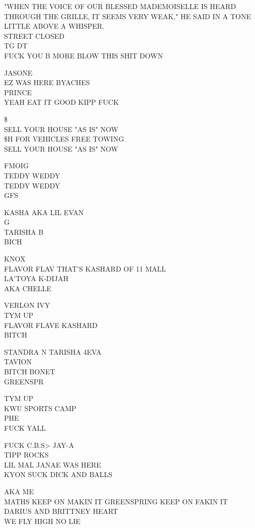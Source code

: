 \documentclass[10pt,letterpaper]{article}
\begin{document}
"WHEN THE VOICE OF OUR BLESSED MADEMOISELLE IS HEARD THROUGH THE GRILLE, IT SEEMS VERY WEAK," HE SAID IN A TONE LITTLE ABOVE A WHISPER.\\
STREET CLOSED\\
TG DT\\
FUCK YOU B MORE BLOW THIS SHIT DOWN

JASONE\\
EZ WAS HERE BYACHES\\
PRINCE\\
YEAH EAT IT GOOD KIPP FUCK

\$\\
SELL YOUR HOUSE "AS IS" NOW\\
\$H FOR VEHICLES FREE TOWING\\
SELL YOUR HOUSE "AS IS" NOW

FMOIG\\
TEDDY WEDDY\\
TEDDY WEDDY\\
GFS

KASHA AKA LIL EVAN\\
G\\
TARISHA B\\
BICH

KNOX\\
FLAVOR FLAV THAT'S KASHARD OF 11 MALL\\
LA'TOYA K{-}DIJAH\\
AKA CHELLE

VERLON IVY\\
TYM UP\\
FLAVOR FLAVE KASHARD\\
BITCH

STANDRA N TARISHA 4EVA\\
TAVION\\
BITCH BONET\\
GREENSPR

TYM UP\\
KWU SPORTS CAMP\\
PHE\\
FUCK YALL

FUCK C.B.S> JAY{-}A\\
TIPP ROCKS\\
LIL MAL JANAE WAS HERE\\
KYON SUCK DICK AND BALLS

AKA ME\\
MATHS KEEP ON MAKIN IT GREENSPRING KEEP ON FAKIN IT\\
DARIUS AND BRITTNEY HEART\\
WE FLY HIGH NO LIE
\end{document}
